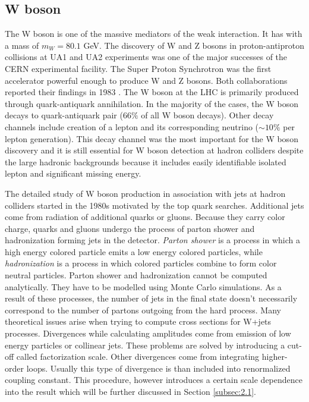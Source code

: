 
\subsection{W boson}

The W boson is one of the massive mediators of the weak interaction. It has with a mass of $m_W=80.1$ GeV.
The discovery of W and Z bosons in proton-antiproton collisions at UA1 and UA2 experiments was one of the major successes of the CERN experimental facility. The Super Proton Synchrotron was the first accelerator powerful enough to produce W and Z bosons. Both collaborations reported their findings in 1983 \cite{Arnison:1983rp,Banner:1983jy}.
The W boson at the LHC is primarily produced through quark-antiquark annihilation. In the majority of the cases, the W boson decays to quark-antiquark pair ($66\%$ of all W boson decays). Other decay channels include creation of a lepton and its corresponding neutrino ($\sim 10\%$ per lepton generation). This decay channel was the most important for the W boson discovery and it is still essential for W boson detection at hadron colliders despite the large hadronic backgrounds because it includes easily identifiable isolated lepton and significant missing energy. 
\par The detailed study of W boson production in association with jets at hadron colliders started in the 1980s motivated by the top quark searches. Additional jets come from radiation of additional quarks or gluons. Because they carry color charge, quarks and gluons undergo the process of parton shower and hadronization forming jets in the detector. \textit{Parton shower} is a process in which a high energy colored particle emits a low energy colored particles, while \textit{hadronization} is a process in which colored particles combine to form color neutral particles. Parton shower and hadronization cannot be computed analytically. They have to be modelled using Monte Carlo simulations. As a result of these processes, the number of jets in the final state doesn't necessarily correspond to the number of partons outgoing from the hard process. Many theoretical issues arise when trying to compute cross sections for W+jets processes. Divergences while calculating amplitudes come from emission of low energy particles or collinear jets. These problems are solved by introducing a cut-off called factorization scale. Other divergences come from integrating higher-order loops. Usually this type of divergence is than included into renormalized coupling constant. This procedure, however introduces a certain scale dependence into the result which will be further discussed in Section \ref{subsec:2.1}. 


